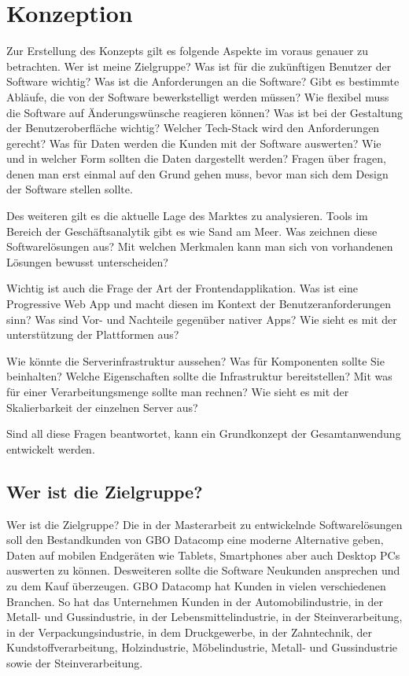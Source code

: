 \chapter{Konzeption}

Zur Erstellung des Konzepts gilt es folgende Aspekte im voraus genauer zu betrachten.
Wer ist meine Zielgruppe? Was ist für die zukünftigen Benutzer der Software wichtig?
Was ist die Anforderungen an die Software? Gibt es bestimmte Abläufe, die von der
Software bewerkstelligt werden müssen? Wie flexibel muss die Software auf Änderungswünsche
reagieren können? Was ist bei der Gestaltung der Benutzeroberfläche wichtig? 
Welcher Tech-Stack wird den Anforderungen gerecht? Was für Daten werden die Kunden mit der
Software auswerten? Wie und in welcher Form sollten die Daten dargestellt werden? 
Fragen über fragen, denen man erst einmal auf den Grund gehen muss, bevor man sich dem
Design der Software stellen sollte.

Des weiteren gilt es die aktuelle Lage des Marktes zu analysieren. Tools im Bereich der
Geschäftsanalytik gibt es wie Sand am Meer. Was zeichnen diese Softwarelösungen aus? Mit welchen
Merkmalen kann man sich von vorhandenen Lösungen bewusst unterscheiden? 

Wichtig ist auch die Frage der Art der Frontendapplikation. Was ist eine Progressive Web App und
macht diesen im Kontext der Benutzeranforderungen sinn? Was sind Vor- und Nachteile gegenüber
nativer Apps? Wie sieht es mit der unterstützung der Plattformen aus?

Wie könnte die Serverinfrastruktur aussehen? Was für Komponenten sollte Sie beinhalten? Welche Eigenschaften
sollte die Infrastruktur bereitstellen? Mit was für einer Verarbeitungsmenge sollte man rechnen? Wie sieht
es mit der Skalierbarkeit der einzelnen Server aus?

Sind all diese Fragen beantwortet, kann ein Grundkonzept der Gesamtanwendung entwickelt werden.

\section{Wer ist die Zielgruppe?}
Wer ist die Zielgruppe? Die in der Masterarbeit zu entwickelnde Softwarelösungen
soll den Bestandkunden von GBO Datacomp eine moderne Alternative geben, Daten 
auf mobilen Endgeräten wie Tablets, Smartphones aber auch Desktop PCs auswerten zu können.
Desweiteren sollte die Software Neukunden ansprechen und zu dem Kauf überzeugen. GBO Datacomp
hat Kunden in vielen verschiedenen Branchen. So hat das Unternehmen Kunden in der
Automobilindustrie, in der Metall- und Gussindustrie, in der Lebensmittelindustrie,
in der Steinverarbeitung, in der Verpackungsindustrie, in dem Druckgewerbe, in der
Zahntechnik, der Kundstoffverarbeitung, Holzindustrie, Möbelindustrie, Metall- und Gussindustrie sowie
der Steinverarbeitung.

